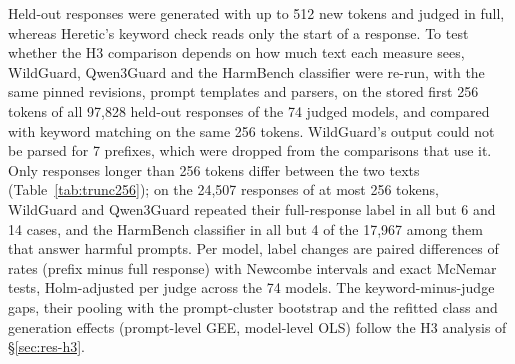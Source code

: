 Held-out responses were generated with up to 512 new tokens and judged in
full, whereas Heretic's keyword check reads only the start of a response. To
test whether the H3 comparison depends on how much text each measure sees,
WildGuard, Qwen3Guard and the HarmBench classifier were re-run, with the same
pinned revisions, prompt templates and parsers, on the stored first 256 tokens
of all 97,828 held-out responses of the 74 judged models, and compared with
keyword matching on the same 256 tokens. WildGuard's output could not be parsed
for 7 prefixes, which were dropped from the comparisons that use it. Only
responses longer than 256 tokens differ between the two texts
(Table~\ref{tab:trunc256}); on the 24,507 responses of at most 256 tokens,
WildGuard and Qwen3Guard repeated their full-response label in all but 6 and
14 cases, and the HarmBench classifier in all but 4 of the 17,967 among them
that answer harmful prompts. Per model, label changes are paired differences
of rates (prefix minus full response) with Newcombe intervals and exact
McNemar tests, Holm-adjusted per judge across the 74 models. The
keyword-minus-judge gaps, their pooling with the prompt-cluster bootstrap and
the refitted class and generation effects (prompt-level GEE, model-level OLS)
follow the H3 analysis of \S\ref{sec:res-h3}.


